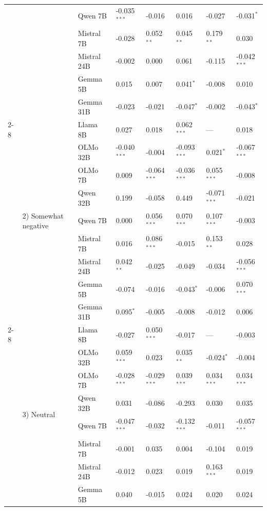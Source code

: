 \begin{longtable}[t]{llllllll}
 &  & Qwen 7B & -0.035$^{***}$ & -0.016 & 0.016 & -0.027 & -0.031$^{*}$ \\
 &  & Mistral 7B & -0.028 & 0.052$^{**}$ & 0.045$^{**}$ & 0.179$^{**}$ & 0.030 \\
 &  & Mistral 24B & -0.002 & 0.000 & 0.061 & -0.115 & -0.042$^{***}$ \\
 &  & Gemma 5B & 0.015 & 0.007 & 0.041$^{*}$ & -0.008 & 0.010 \\
 &  & Gemma 31B & -0.023 & -0.021 & -0.047$^{*}$ & -0.002 & -0.043$^{*}$ \\
\cline{2-8}
 & \multirow[t]{9}{*}{2) Somewhat negative} & Llama 8B & 0.027 & 0.018 & 0.062$^{***}$ & --- & 0.018 \\
 &  & OLMo 32B & -0.040$^{***}$ & -0.004 & -0.093$^{***}$ & 0.021$^{*}$ & -0.067$^{***}$ \\
 &  & OLMo 7B & 0.009 & -0.064$^{***}$ & -0.036$^{***}$ & 0.055$^{***}$ & -0.008 \\
 &  & Qwen 32B & 0.199 & -0.058 & 0.449 & -0.071$^{***}$ & -0.021 \\
 &  & Qwen 7B & 0.000 & 0.056$^{***}$ & 0.070$^{***}$ & 0.107$^{***}$ & -0.003 \\
 &  & Mistral 7B & 0.016 & 0.086$^{***}$ & -0.015 & 0.153$^{**}$ & 0.028 \\
 &  & Mistral 24B & 0.042$^{**}$ & -0.025 & -0.049 & -0.034 & -0.056$^{***}$ \\
 &  & Gemma 5B & -0.074 & -0.016 & -0.043$^{*}$ & -0.006 & 0.070$^{***}$ \\
 &  & Gemma 31B & 0.095$^{*}$ & -0.005 & -0.008 & -0.012 & 0.006 \\
\cline{2-8}
 & \multirow[t]{9}{*}{3) Neutral} & Llama 8B & -0.027 & 0.050$^{***}$ & -0.017 & --- & -0.003 \\
 &  & OLMo 32B & 0.059$^{***}$ & 0.023 & 0.035$^{**}$ & -0.024$^{*}$ & -0.004 \\
 &  & OLMo 7B & -0.028$^{***}$ & -0.029$^{***}$ & 0.039$^{***}$ & 0.034$^{***}$ & 0.034$^{***}$ \\
 &  & Qwen 32B & 0.031 & -0.086 & -0.293 & 0.030 & 0.035 \\
 &  & Qwen 7B & -0.047$^{***}$ & -0.032 & -0.132$^{***}$ & -0.011 & -0.057$^{***}$ \\
 &  & Mistral 7B & -0.001 & 0.035 & 0.004 & -0.104 & 0.019 \\
 &  & Mistral 24B & -0.012 & 0.023 & 0.019 & 0.163$^{***}$ & 0.019 \\
 &  & Gemma 5B & 0.040 & -0.015 & 0.024 & 0.020 & 0.024 \\

\end{longtable}

